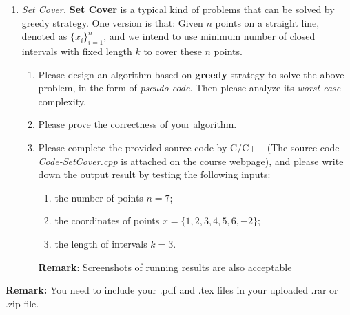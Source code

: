 \documentclass[12pt,a4paper]{article}
\makeatletter
\newtheorem*{solution}{Solution}
\theoremstyle{definition}
\renewenvironment{solution}[1][Solution] {\par\pushQED{\qed}\normalfont\topsep6\p@\@plus6\p@\relax\trivlist\item[\hskip\labelsep\bfseries#1\@addpunct{.}]\ignorespaces}{\popQED\endtrivlist\@endpefalse} \makeatother
\makeatother
\begin{document}
\begin{enumerate}
    \item \textit{Set Cover.} \textbf{Set Cover} is a typical kind of problems that can be solved by greedy strategy. One version is that: Given $n$ points on a straight line, denoted as $\{x_i\}_{i=1}^n$, and we intend to use minimum number of closed intervals with fixed length $k$ to cover these $n$ points.
    \begin{enumerate}
    	\item Please design an algorithm based on \textbf{greedy} strategy to solve the above problem, in the form of \emph{pseudo code}. Then please analyze its \emph{worst-case} complexity.
    	\item Please prove the correctness of your algorithm.
    	\item Please complete the provided source code by C/C++ {\color{blue}(The source code \emph{Code-SetCover.cpp} is attached on the course webpage)}, and please write down the output result by testing the following inputs: 
    	\begin{enumerate}
    		\item the number of points $n=7$;
    		\item the coordinates of points
    		$x=\{1,2,3,4,5,6,-2\}$;
    		\item the length of intervals
    		$k=3$.
    	\end{enumerate}
        \textbf{Remark}: Screenshots of running results are also acceptable 
    \end{enumerate}

\end{enumerate}



\vspace{20pt}

\textbf{Remark:} You need to include your .pdf and .tex files in your uploaded .rar or .zip file.

\end{document}

